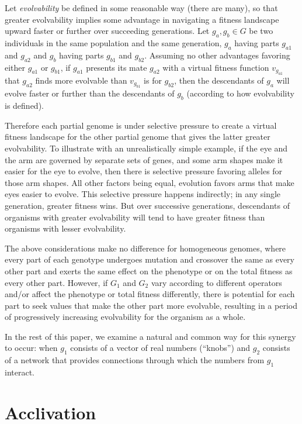 \documentclass[letterpaper]{article}
\begin{document}
Let \textit{evolvability} be defined in some reasonable way (there are many),
so that greater evolvability implies some advantage in navigating a fitness
landscape upward faster or further over succeeding generations. Let $g_a,g_b
\in G$ be two individuals in the same population and the same generation,
$g_a$ having parts $g_{a1}$ and $g_{a2}$ and $g_b$ having parts $g_{b1}$ and
$g_{b2}$.  Assuming no other advantages favoring either $g_{a1}$ or $g_{b1}$,
if $g_{a1}$ presents its mate $g_{a2}$ with a virtual fitness function
$v_{g_{a1}}$ that $g_{a2}$ finds more evolvable than $v_{g_{b1}}$ is for
$g_{b2}$, then the descendants of $g_a$ will evolve faster or further than the
descendants of $g_b$ (according to how evolvability is defined).

Therefore each partial genome is under selective pressure to create a virtual
fitness landscape for the other partial genome that gives the latter greater
evolvability. To illustrate with an unrealistically simple example, if the eye
and the arm are governed by separate sets of genes, and some arm shapes make
it easier for the eye to evolve, then there is selective pressure favoring
alleles for those arm shapes. All other factors being equal, evolution favors
arms that make eyes easier to evolve. This selective pressure happens
indirectly; in any single generation, greater fitness wins. But over successive
generations, descendants of organisms with greater evolvability will tend to
have greater fitness than organisms with lesser evolvability.

The above considerations make no difference for homogeneous genomes, where
every part of each genotype undergoes mutation and crossover the same as every
other part and exerts the same effect on the phenotype or on the total fitness
as every other part. However, if $G_1$ and $G_2$ vary according to different
operators and/or affect the phenotype or total fitness differently, there is
potential for each part to seek values that make the other part more
evolvable, resulting in a period of progressively increasing evolvability for
the organism as a whole.

In the rest of this paper, we examine a natural and common way for this
synergy to occur: when $g_1$ consists of a vector of real numbers (``knobs'')
and $g_2$ consists of a network that provides connections through which the
numbers from $g_1$ interact.

\section{Acclivation}
\end{document}
